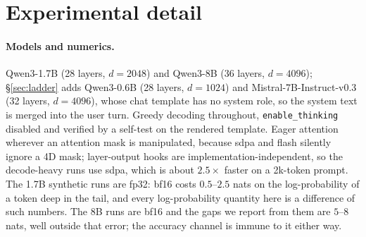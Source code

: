 \documentclass{article}
\newcommand{\dvec}{\ensuremath{d}}
\newcommand{\gvec}{\ensuremath{g}}
\begin{document}
\begin{table}[h]
\caption{The content component split along its own shared direction and
orthogonal to it, rescued cell, $n_R=82$. The crossover at layer 21 is the same
layer at which cumulative attention knockout on the document becomes free
(\S\ref{sec:where}) and at which another item's content vector stops working
(\S\ref{sec:whose}).}
\label{tab:parperp}
\centering
\small

\end{table}

\begin{table}[h]
\caption{The decomposition of Eq.~\ref{eq:decomp}, synthetic control,
Qwen3-1.7B, fp32, $n=358$, at the last prompt position. $\mathrm{PR}$ is the
participation ratio of $\{\dvec_i\}$ after removing their shared mean direction:
the effective number of dimensions the item-to-item variation occupies, out of
2048. The last column is the fraction of a single item's $\dvec_i$ that lies
along that shared direction.}
\label{tab:geometry-tierA}
\centering
\small

\end{table}
\begin{table}[h]
\caption{Fraction of the rescued cell answered correctly under each injected
component. Synthetic control, multiple choice, Qwen3-1.7B, fp32, $n=358$,
rescued cell $n_R=82$. Bootstrap 95\% CIs over items are $\pm0.09$ to $\pm0.11$
at these magnitudes and are given in the appendix. $\bar{\dvec}$ is the mean
content direction over items, restored to the typical per-item norm; $\dvec_j$
is another item's content vector, drawn from the same or a different conversion
family. The row that licenses the name ``content component'' is $\gvec$.}
\label{tab:causal}
\centering
\small

\end{table}

\section{Experimental detail}
\label{app:detail}

\paragraph{Models and numerics.} Qwen3-1.7B (28 layers, $d=2048$) and Qwen3-8B
(36 layers, $d=4096$); \S\ref{sec:ladder} adds Qwen3-0.6B (28 layers, $d=1024$)
and Mistral-7B-Instruct-v0.3 (32 layers, $d=4096$), whose chat template has no
system role, so the system text is merged into the user turn. Greedy decoding throughout, \texttt{enable\_thinking}
disabled and verified by a self-test on the rendered template. Eager attention
wherever an attention mask is manipulated, because sdpa and flash silently
ignore a 4D mask; layer-output hooks are implementation-independent, so the
decode-heavy runs use sdpa, which is about $2.5\times$ faster on a 2k-token
prompt. The 1.7B synthetic runs are fp32: bf16 costs $0.5$--$2.5$ nats on the
log-probability of a token deep in the tail, and every log-probability quantity
here is a difference of such numbers. The 8B runs are bf16 and the gaps we
report from them are $5$--$8$ nats, well outside that error; the accuracy
channel is immune to it either way.
\end{document}
